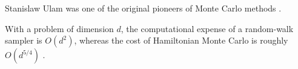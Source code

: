 \documentclass[british]{article}
\begin{document}
	
	Stanislaw Ulam was one of the original pioneers of Monte Carlo methods
	\cite{Verwimp2020}.
	
	With a problem of dimension $d$, the computational expense of a random-walk
	sampler is $O(d^2)$, whereas the cost of Hamiltonian Monte Carlo is roughly
	$O(d^{5/4})$ \cite{Mnih2008}.
	
	\printbibliography
	
\end{document}
